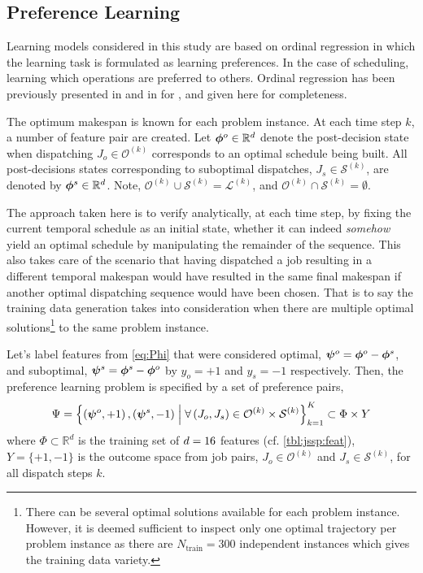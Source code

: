 \documentclass[smallextended]{svjour3}
\begin{document}
\subsection{Preference Learning}\label{sec:liblinear}
Learning models considered in this study are based on ordinal regression in 
which the learning task is formulated as learning preferences. In the case of 
scheduling, learning which operations are preferred to others. Ordinal 
regression has been previously presented in \cite{Ru06:PPSN} and in 
\cite{InRu11a} for \JSP, and given here for completeness. 

The optimum makespan is known for each problem instance. At each time step $k$, 
a number of feature pair are created. 
Let $\bm{\phi}^{o}\in{\mathbb R}^d$ denote the post-decision state when dispatching 
$J_o\in\mathcal{O}^{(k)}$ corresponds to an optimal schedule being built. 
All post-decisions states corresponding to suboptimal dispatches, 
$J_s\in\mathcal{S}^{(k)}$, are denoted by $\bm{\phi}^{s}\in{\mathbb R}^d$.
Note, \mbox{$\mathcal{O}^{(k)}\cup\mathcal{S}^{(k)}=\mathcal{L}^{(k)}$}, and 
\mbox{$\mathcal{O}^{(k)}\cap\mathcal{S}^{(k)}=\emptyset$}.

The approach taken here is to verify analytically, at each time step, by fixing 
the current temporal schedule as an initial state, whether it can indeed 
\emph{somehow} yield an optimal schedule by manipulating the remainder of the 
sequence. This also takes care of the scenario that having dispatched a job 
resulting in a different temporal makespan would have resulted in the same 
final makespan if another optimal dispatching sequence would have been chosen. 
That is to say the training data generation takes into consideration when there 
are multiple optimal solutions\footnote{
  There can be several optimal solutions available for each problem instance. 
  However, it is deemed sufficient to inspect only one optimal trajectory per 
  problem instance as there are $N_{\text{train}}=300$ independent instances 
  which gives the training data variety.} 
to the same problem instance. 

Let's label features from \cref{eq:Phi} that were considered optimal, 
\mbox{$\bm \psi^{o}=\bm{\phi}^{o}-\bm{\phi}^{s}$}, and suboptimal, 
\mbox{$\bm \psi^{s}=\bm{\phi}^{s}-\bm{\phi}^{o}$} by $y_o=+1$ and $y_s=-1$ respectively.  
Then, the preference learning problem is specified by a set of preference pairs,
\begin{equation}
\Psi = 
\left\{\left(\bm \psi^o,+1\right),\left(\bm \psi^s,-1\right)
\;\middle|\;\forall \left(J_o,J_s\right) \in \mathcal{O}^{(k)} \times 
\mathcal{S}^{(k)}\right\}_{k=1}^{K} \subset \Phi\times Y \label{eq:prefset}
\end{equation}
where $\Phi\subset \mathbb{R}^d$ is the training set of $d=16$ 
features (cf. \cref{tbl:jssp:feat}), $Y=\{+1,-1\}$ is the outcome space from 
job pairs, $J_o\in\mathcal{O}^{(k)}$ and $J_s\in\mathcal{S}^{(k)}$, for all 
dispatch steps $k$.
\end{document}
